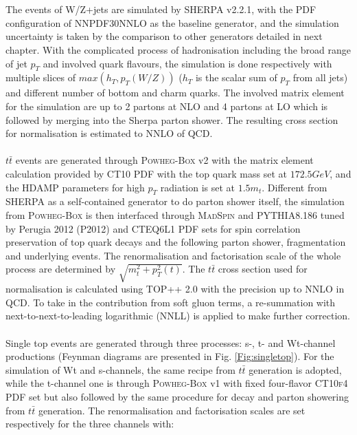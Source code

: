 \\
\\The events of W/Z+jets are simulated by \textsc{SHERPA} v2.2.1\cite{sherpa22_twiki}, with the PDF configuration of \textsc{NNPDF30NNLO}\cite{Ball:2012cx} as the baseline generator, and the simulation uncertainty is taken by the comparison to other generators detailed in next chapter. With the complicated process of hadronisation including the broad range of jet $p_{T}$ and involved quark flavours, the simulation is done respectively with multiple slices of $max(h_{T}, p_{T}(W/Z))$ ($h_{T}$ is the scalar sum of $p_{T}$ from all jets) and different number of bottom and charm quarks. The involved matrix element for the simulation are up to 2 partons at NLO and 4 partons at LO which is followed by merging into the Sherpa parton shower. The resulting cross section for normalisation is estimated to NNLO of QCD.
\\
\\$t\bar{t}$ events are generated through \textsc{Powheg-Box}\cite{Alioli:2010xd} v2 with the matrix element calculation provided by \textsc{CT10 PDF}\cite{Gao:2013xoa} with the top quark mass set at $172.5GeV$, and the \textsc{HDAMP} parameters for high $p_{T}$ radiation is set at $1.5m_{t}$. Different from \textsc{SHERPA} as a self-contained generator to do parton shower itself, the simulation from \textsc{Powheg-Box} is then interfaced through \textsc{MadSpin}\cite{Artoisenet:2012st} and \textsc{PYTHIA}8.186 tuned by Perugia 2012 (P2012)\cite{mc11ctunes} and \textsc{CTEQ6L1 PDF}\cite{Stump:2003yu} sets for spin correlation preservation of top quark decays and the following parton shower, fragmentation and underlying events. The renormalisation and factorisation scale of the whole process are determined by $\sqrt{m_{t}^2+p^2_{T}(t)}$. The $t\bar{t}$ cross section used for normalisation is calculated using \textsc{TOP++} 2.0\cite{Czakon:2013goa} with the precision up to NNLO in QCD. To take in the contribution from soft gluon terms, a re-summation with next-to-next-to-leading logarithmic (NNLL) is applied to make further correction.  
\\
\\Single top events are generated through three processes: s-, t- and Wt-channel productions (Feynman diagrams are presented in Fig. \ref{Fig:singletop}). For the simulation of Wt and s-channels, the same recipe from $t\bar{t}$ generation is adopted, while the t-channel one is through \textsc{Powheg-Box} v1 with fixed four-flavor \textsc{CT10f4 PDF}\cite{Lai:2010vv} set but also followed by the same procedure for decay and parton showering from $t\bar{t}$ generation. The renormalisation and factorisation scales are set respectively for the three channels with:
